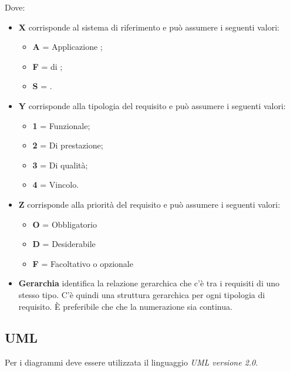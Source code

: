 Dove:
\begin{itemize}
 \item \textbf{X} corrisponde al sistema di riferimento e può assumere i seguenti valori:
	\begin{itemize}
	 \item[] \textbf{A} = Applicazione ;
	 \item[] \textbf{F} =  di ;
	 \item[] \textbf{S} = .
	\end{itemize}

 \item \textbf{Y} corrisponde alla tipologia del requisito e può assumere i seguenti valori:
	\begin{itemize}
	 \item[] \textbf{1} = Funzionale;
	 \item[] \textbf{2} = Di prestazione;
	 \item[] \textbf{3} = Di qualità;
	 \item[] \textbf{4} = Vincolo.
	\end{itemize}

 \item \textbf{Z} corrisponde alla priorità del requisito e può assumere i seguenti valori:
	\begin{itemize}
	 \item[] \textbf{O} = Obbligatorio
	 \item[] \textbf{D} = Desiderabile
	 \item[] \textbf{F} = Facoltativo o opzionale
	\end{itemize}

 \item \textbf{Gerarchia} identifica la relazione gerarchica che c'è tra i requisiti di uno stesso tipo. C'è quindi una struttura gerarchica per ogni tipologia di requisito. È preferibile che che la numerazione sia continua.
\end{itemize}

\subsection{UML}

Per i diagrammi deve essere utilizzata il linguaggio \emph{UML versione 2.0}.
